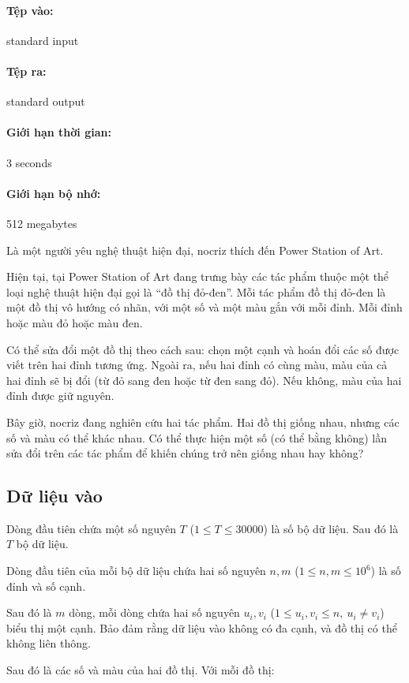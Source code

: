 \documentclass[11pt]{article}
\begin{document}
\paragraph{Tệp vào:} standard input
\paragraph{Tệp ra:} standard output
\paragraph{Giới hạn thời gian:} 3 seconds
\paragraph{Giới hạn bộ nhớ:} 512 megabytes

Là một người yêu nghệ thuật hiện đại, nocriz thích đến Power Station of Art.

Hiện tại, tại Power Station of Art đang trưng bày các tác phẩm thuộc một thể
loại nghệ thuật hiện đại gọi là ``đồ thị đỏ-đen''. Mỗi tác phẩm đồ thị đỏ-đen
là một đồ thị vô hướng có nhãn, với một số và một màu gắn với mỗi đỉnh. Mỗi
đỉnh hoặc màu đỏ hoặc màu đen.

Có thể sửa đổi một đồ thị theo cách sau: chọn một cạnh và hoán đổi các số
được viết trên hai đỉnh tương ứng. Ngoài ra, nếu hai đỉnh có cùng màu, màu
của cả hai đỉnh sẽ bị đổi (từ đỏ sang đen hoặc từ đen sang đỏ). Nếu không,
màu của hai đỉnh được giữ nguyên.

Bây giờ, nocriz đang nghiên cứu hai tác phẩm. Hai đồ thị giống nhau, nhưng
các số và màu có thể khác nhau. Có thể thực hiện một số (có thể bằng không)
lần sửa đổi trên các tác phẩm để khiến chúng trở nên giống nhau hay không?

\subsection*{Dữ liệu vào}

Dòng đầu tiên chứa một số nguyên \(T\) (\(1\le T\le 30000\)) là số bộ dữ
liệu. Sau đó là \(T\) bộ dữ liệu.

Dòng đầu tiên của mỗi bộ dữ liệu chứa hai số nguyên \(n,m\)
(\(1\le n,m\le 10^6\)) là số đỉnh và số cạnh.

Sau đó là \(m\) dòng, mỗi dòng chứa hai số nguyên \(u_i,v_i\)
(\(1\le u_i,v_i\le n,\ u_i\ne v_i\)) biểu thị một cạnh. Bảo đảm rằng dữ liệu
vào không có đa cạnh, và đồ thị có thể không liên thông.

Sau đó là các số và màu của hai đồ thị. Với mỗi đồ thị:
\end{document}
